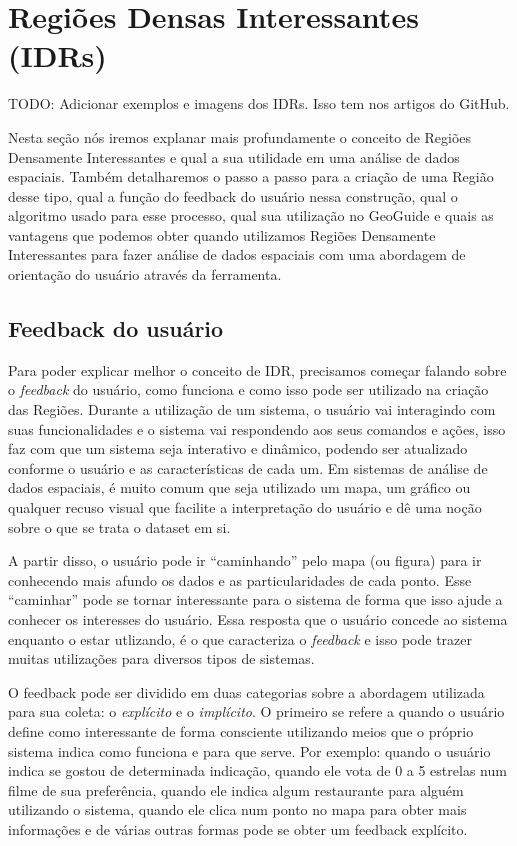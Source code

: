 \chapter{Regiões Densas Interessantes (IDRs)}

TODO: Adicionar exemplos e imagens dos IDRs. Isso tem nos artigos do GitHub.

Nesta seção nós iremos explanar mais profundamente o conceito de Regiões Densamente Interessantes e qual a sua utilidade em uma análise de dados espaciais. Também detalharemos o passo a passo para a criação de uma Região desse tipo, qual a função do feedback do usuário nessa construção, qual o algoritmo usado para esse processo, qual sua utilização no GeoGuide e quais as vantagens que podemos obter quando utilizamos Regiões Densamente Interessantes para fazer análise de dados espaciais com uma abordagem de orientação do usuário através da ferramenta.

\section{Feedback do usuário}

Para poder explicar melhor o conceito de IDR, precisamos começar falando sobre o \textit{feedback} do usuário, como funciona e como isso pode ser utilizado na criação das Regiões. Durante a utilização de um sistema, o usuário vai interagindo com suas funcionalidades e o sistema vai respondendo aos seus comandos e ações, isso faz com que um sistema seja interativo e dinâmico, podendo ser atualizado conforme o usuário e as características de cada um. Em sistemas de análise de dados espaciais, é muito comum que seja utilizado um mapa, um gráfico ou qualquer recuso visual que facilite a interpretação do usuário e dê uma noção sobre o que se trata o dataset em si.

A partir disso, o usuário pode ir ``caminhando'' pelo mapa (ou figura) para ir conhecendo mais afundo os dados e as particularidades de cada ponto. Esse ``caminhar'' pode se tornar interessante para o sistema de forma que isso ajude a conhecer os interesses do usuário. Essa resposta que o usuário concede ao sistema enquanto o estar utlizando, é o que caracteriza o \textit{feedback} e isso pode trazer muitas utilizações para diversos tipos de sistemas.

O feedback pode ser dividido em duas categorias sobre a abordagem utilizada para sua coleta: o \textit{explícito} e o \textit{implícito}. O primeiro se refere a quando o usuário define como interessante de forma consciente utilizando meios que o próprio sistema indica como funciona e para que serve. Por exemplo: quando o usuário indica se gostou de determinada indicação, quando ele vota de 0 a 5 estrelas num filme de sua preferência, quando ele indica algum restaurante para alguém utilizando o sistema, quando ele clica num ponto no mapa para obter mais informações e de várias outras formas pode se obter um feedback explícito.

